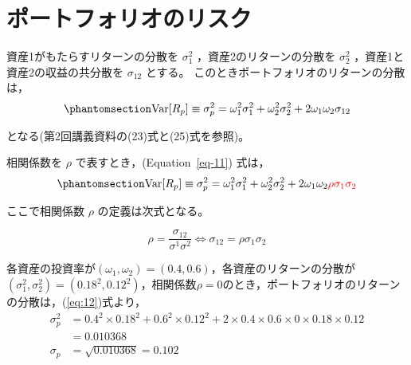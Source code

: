 \documentclass[
  letterpaper,
  pandoc,
  ja=standard,
  jafont = hiragino-pron]{ltjsbook}
\begin{document}
\section{ポートフォリオのリスク}\label{ux30ddux30fcux30c8ux30d5ux30a9ux30eaux30aaux306eux30eaux30b9ux30af}

資産1がもたらすリターンの分散を \(\sigma^2 _1\)
，資産2のリターンの分散を \(\sigma^2 _2\) ，資産1と資産2の収益の共分散を
\(\sigma _{12}\) とする。 このときポートフォリオのリターンの分散は，
\begin{equation}\phantomsection\label{eq-11}{
\mathrm{Var} [R_p] \equiv \sigma ^2_p = \omega _1^2 \sigma ^2_1 + \omega_2^2 \sigma ^2_2 + 2 \omega _1 \omega_2 \sigma _{12}
}\end{equation}

となる(第2回講義資料の(23)式と(25)式を参照)。

相関係数を \(\rho\) で表すとき，(Equation~\ref{eq-11}) 式は，
\begin{equation}\phantomsection\label{eq-12}{
\mathrm{Var} [R_p] \equiv \sigma ^2_p = \omega _1^2 \sigma ^2_1 + \omega_2^2 \sigma ^2_2 + 2 \omega _1 \omega_2  \textcolor{red}{\rho \sigma _1 \sigma _2}
}\end{equation}

ここで相関係数 \(\rho\) の定義は次式となる。

\[
\rho = \frac{\sigma _{12}}{\sigma ^1 \sigma ^2} \Longleftrightarrow  \sigma _{12} = \rho \sigma _1 \sigma _2
\]

\begin{tcolorbox}[enhanced jigsaw, colframe=quarto-callout-tip-color-frame, breakable, rightrule=.15mm, coltitle=black, title=\textcolor{quarto-callout-tip-color}{\faLightbulb}\hspace{0.5em}{例6}, colbacktitle=quarto-callout-tip-color!10!white, leftrule=.75mm, colback=white, left=2mm, arc=.35mm, opacityback=0, titlerule=0mm, toptitle=1mm, bottomtitle=1mm, bottomrule=.15mm, toprule=.15mm, opacitybacktitle=0.6]

各資産の投資率が\((\omega _1, \omega _2) =(0.4, 0.6)\)，各資産のリターンの分散が\((\sigma^2_1, \sigma ^2_2) =(0.18^2, 0.12^2)\)，相関係数\(\rho =0\)のとき，ポートフォリオのリターンの分散は，(\ref{eq:12})式より，
\[
\begin{aligned}
\sigma ^2_p &= 0.4^2 \times 0.18^2 + 0.6^2 \times 0.12^2 + 2 \times 0.4 \times 0.6 \times 0 \times 0.18 \times 0.12\\
            &= 0.010368 \nonumber \\
\sigma _p   &= \sqrt{0.010368} = 0.102 \nonumber
\end{aligned}
\]

\end{tcolorbox}
\end{document}
